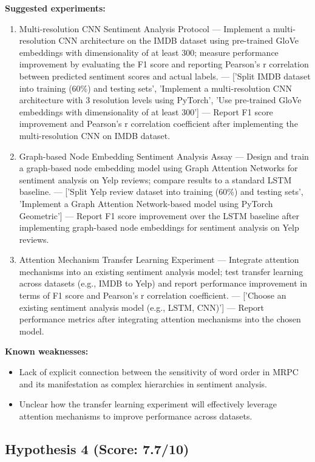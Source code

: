 \documentclass[12pt,a4paper]{article}
\begin{document}
\textbf{Suggested experiments:}
\begin{enumerate}
  \item Multi-resolution CNN Sentiment Analysis Protocol — Implement a multi-resolution CNN architecture on the IMDB dataset using pre-trained GloVe embeddings with dimensionality of at least 300; measure performance improvement by evaluating the F1 score and reporting Pearson's r correlation between predicted sentiment scores and actual labels. — ['Split IMDB dataset into training (60\%) and testing sets', 'Implement a multi-resolution CNN architecture with 3 resolution levels using PyTorch', 'Use pre-trained GloVe embeddings with dimensionality of at least 300'] — Report F1 score improvement and Pearson's r correlation coefficient after implementing the multi-resolution CNN on IMDB dataset.
  \item Graph-based Node Embedding Sentiment Analysis Assay — Design and train a graph-based node embedding model using Graph Attention Networks for sentiment analysis on Yelp reviews; compare results to a standard LSTM baseline. — ['Split Yelp review dataset into training (60\%) and testing sets', 'Implement a Graph Attention Network-based model using PyTorch Geometric'] — Report F1 score improvement over the LSTM baseline after implementing graph-based node embeddings for sentiment analysis on Yelp reviews.
  \item Attention Mechanism Transfer Learning Experiment — Integrate attention mechanisms into an existing sentiment analysis model; test transfer learning across datasets (e.g., IMDB to Yelp) and report performance improvement in terms of F1 score and Pearson's r correlation coefficient. — ['Choose an existing sentiment analysis model (e.g., LSTM, CNN)'] — Report performance metrics after integrating attention mechanisms into the chosen model.
\end{enumerate}

\textbf{Known weaknesses:}
\begin{itemize}
  \item Lack of explicit connection between the sensitivity of word order in MRPC and its manifestation as complex hierarchies in sentiment analysis.
  \item Unclear how the transfer learning experiment will effectively leverage attention mechanisms to improve performance across datasets.
\end{itemize}
\subsection*{Hypothesis 4 (Score: 7.7/10)}
\end{document}
